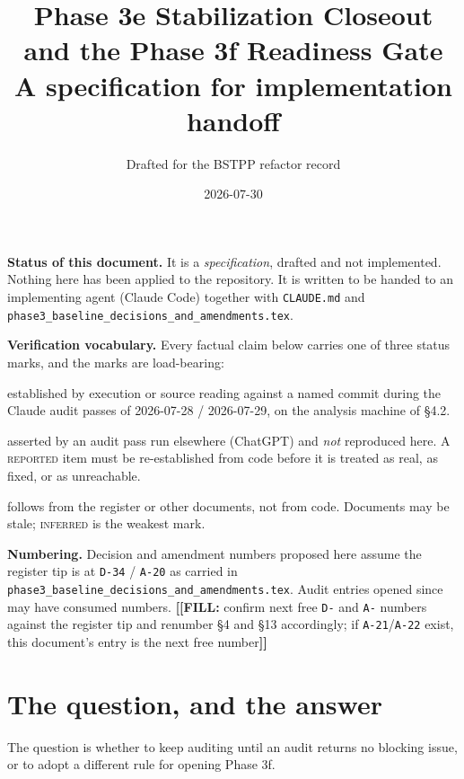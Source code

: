 \documentclass[11pt]{article}
\title{\bfseries Phase 3e Stabilization Closeout and the Phase 3f Readiness Gate\\
\large A specification for implementation handoff}
\author{Drafted for the BSTPP refactor record}
\date{2026-07-30}
\newcommand{\fillanchor}[1]{{\color{red}\textbf{[[FILL:} #1\textbf{]]}}}
\newcommand{\vfy}{\textsc{verified-here}}
\newcommand{\rep}{\textsc{reported}}
\newcommand{\infd}{\textsc{inferred}}
\renewcommand{\tt}[1]{\texttt{#1}}
\newenvironment{ruling}{\begin{leftbar}\small}{\end{leftbar}}
\begin{document}
\maketitle

\begin{ruling}
\noindent\textbf{Status of this document.} It is a \emph{specification}, drafted and not
implemented. Nothing here has been applied to the repository. It is written to be handed
to an implementing agent (Claude Code) together with \tt{CLAUDE.md} and
\tt{phase3\allowbreak{}\_baseline\allowbreak{}\_decisions\allowbreak{}\_and\allowbreak{}\_amendments.tex}.

\noindent\textbf{Verification vocabulary.} Every factual claim below carries one of three
status marks, and the marks are load-bearing:
\begin{description}[leftmargin=2.2em,style=nextline,font=\normalfont]
  \item[\vfy] established by execution or source reading against a named commit during the
  Claude audit passes of 2026-07-28 / 2026-07-29, on the analysis machine of \S4.2.
  \item[\rep] asserted by an audit pass run elsewhere (ChatGPT) and \emph{not} reproduced
  here. A \rep{} item must be re-established from code before it is treated as real, as
  fixed, or as unreachable.
  \item[\infd] follows from the register or other documents, not from code. Documents may
  be stale; \infd{} is the weakest mark.
\end{description}

\noindent\textbf{Numbering.} Decision and amendment numbers proposed here assume the
register tip is at \tt{D-34} / \tt{A-20} as carried in
\tt{phase3\allowbreak{}\_baseline\allowbreak{}\_decisions\allowbreak{}\_and\allowbreak{}\_amendments.tex}.
Audit entries opened since may have consumed numbers.
\fillanchor{confirm next free \tt{D-} and \tt{A-} numbers against the register tip and
renumber \S4 and \S13 accordingly; if \tt{A-21}/\tt{A-22} exist, this document's entry is
the next free number}
\end{ruling}

\section{The question, and the answer}

The question is whether to keep auditing until an audit returns no blocking issue, or to
adopt a different rule for opening Phase 3f.
\end{document}
